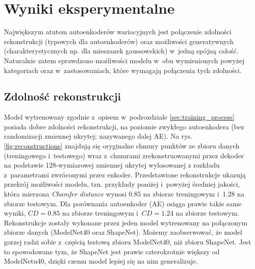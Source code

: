\documentclass{iithesis}
\begin{document}
\chapter{Wyniki eksperymentalne}
Największym atutem autoenkoderów wariacyjnych jest połączenie zdolności rekonstrukcji
(typowych dla autoenkoderów) oraz możliwości generatywnych (charakterystycznych np.
dla mieszanek gaussowskich) w~jedną spójną całość.
Naturalnie zatem sprawdzono możliwości modelu w~obu wymienionych powyżej kategoriach
oraz w~zastosowaniach, które wymagają połączenia tych zdolności.

\section{Zdolność rekonstrukcji}
Model wytrenowany zgodnie z~opisem w~podrozdziale \ref{sec:training_process} posiada dobre zdolności
rekonstrukcji, na poziomie zwykłego autoenkodera (bez randomizacji zmiennej ukrytej; nazywanego dalej AE).
Na rys. \ref{fig:reconstructions} znajdują się oryginalne chmury punktów ze zbioru danych (treningowego i~testowego)
wraz z~chmurami zrekonstruowanymi przez dekoder na podstawie 128-wymiarowej zmiennej ukrytej wylosowanej
z rozkładu z~parametrami zwróconymi przez enkoder.
Przedstawione rekonstrukcje ukazują przekrój możliwości modelu, tzn. przykłady poniżej i~powyżej średniej jakości,
która mierzona \textit{Chamfer distance} wynosi 0.85 na zbiorze treningowym i~1.28 na zbiorze testowym.
Dla porównania autoenkoder (AE) osiąga prawie takie same wyniki,
$CD = 0.85$ na zbiorze treningowym i~$CD = 1.24$ na zbiorze testowym.
Rekonstrukcje zostały wykonane przez jeden model wytrenowany na połączonym zbiorze danych (ModelNet40 oraz ShapeNet).
Możemy zaobserwować, że model gorzej radzi sobie z~częścią testową zbioru ModelNet40, niż zbioru ShapeNet.
Jest to spowodowane tym, że ShapeNet jest prawie czterokrotnie większy od ModelNetu40, dzięki czemu model lepiej
się na nim generalizuje.
\end{document}
